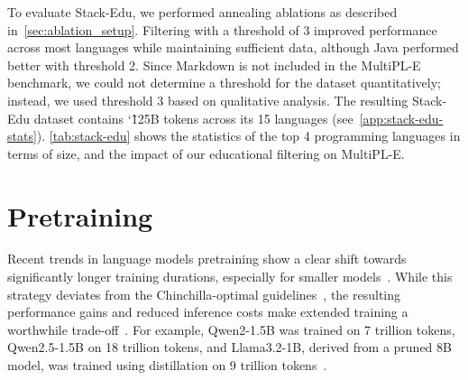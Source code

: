 \documentclass{article}
\theoremstyle{plain}
\theoremstyle{definition}
\theoremstyle{remark}
\begin{document}
To evaluate Stack-Edu, we performed annealing ablations
as described in~\cref{sec:ablation_setup}.
Filtering with a threshold of 3 improved performance across most languages while maintaining sufficient data, although Java performed better with threshold 2.
Since Markdown is not included in the MultiPL-E benchmark, we could not determine a threshold for the dataset quantitatively; instead, we used threshold 3 based on qualitative analysis.
The resulting Stack-Edu dataset contains \char`\~125B tokens across its 15 languages (see~\cref{app:stack-edu-stats}).
\cref{tab:stack-edu} shows the statistics of the top 4 programming languages in terms of size, and the impact of our educational filtering on MultiPL-E.

\begin{table}[t]
\caption{Stack-Edu dataset statistics and MultiPL-E scores for the top 4 (in terms of size) programming languages. We use HumanEval for Python evaluation.}
\vspace{-0.5pt} 
\label{tab:stack-edu}
\centering
\small
{}
\vspace{-10pt} 
\end{table}

\section{Pretraining}

\label{sec:pretraining-phases}
Recent trends in language models pretraining show a clear shift towards significantly longer training durations, especially for smaller models~\cite{Qwen2TR,Yang2024Qwen2TR,llama3_2modelcard}. While this strategy deviates from the Chinchilla-optimal guidelines~\cite{hoffmann2022training}, the resulting performance gains and reduced inference costs make extended training a worthwhile trade-off~\cite{harms_law}. For example, Qwen2-1.5B was trained on 7 trillion tokens, Qwen2.5-1.5B on 18 trillion tokens, and Llama3.2-1B, derived from a pruned 8B model, was trained using distillation on 9 trillion tokens~\cite{Qwen2TR,Yang2024Qwen2TR,llama3_2modelcard}.
\end{document}
